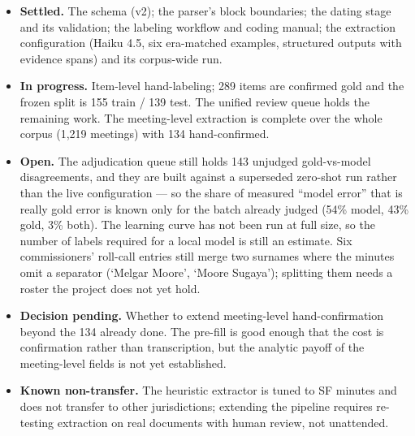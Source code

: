 \documentclass[11pt]{article}
\begin{document}
\begin{itemize}
\item \textbf{Settled.} The schema (v2); the parser's block boundaries; the dating stage
and its validation; the labeling workflow and coding manual; the extraction configuration
(Haiku 4.5, six era-matched examples, structured outputs with evidence spans) and its
corpus-wide run.
\item \textbf{In progress.} Item-level hand-labeling; 289 items are confirmed gold and the
frozen split is 155 train / 139 test. The unified review queue holds the remaining work.
The meeting-level extraction is complete over the whole corpus (1{,}219 meetings) with 134
hand-confirmed.
\item \textbf{Open.} The adjudication queue still holds 143 unjudged gold-vs-model
disagreements, and they are built against a superseded zero-shot run rather than the live
configuration --- so the share of measured ``model error'' that is really gold error is
known only for the batch already judged (54\% model, 43\% gold, 3\% both). The learning
curve has not been run at full size, so the number of labels required for a local model is
still an estimate. Six commissioners' roll-call entries still merge two surnames where the
minutes omit a separator (`Melgar Moore', `Moore Sugaya'); splitting them needs a roster
the project does not yet hold.
\item \textbf{Decision pending.} Whether to extend meeting-level hand-confirmation beyond
the 134 already done. The pre-fill is good enough that the cost is confirmation rather than
transcription, but the analytic payoff of the meeting-level fields is not yet established.
\item \textbf{Known non-transfer.} The heuristic extractor is tuned to SF minutes and does
not transfer to other jurisdictions; extending the pipeline requires re-testing extraction
on real documents with human review, not unattended.
\end{itemize}
\end{document}
